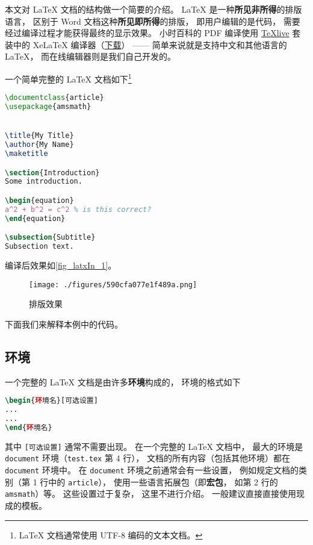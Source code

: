 
本文对 LaTeX 文档的结构做一个简要的介绍。 LaTeX 是一种\textbf{所见非所得}的排版语言， 区别于 Word 文档这种\textbf{所见即所得}的排版， 即用户编辑的是代码， 需要经过编译过程才能获得最终的显示效果。 小时百科的 PDF 编译使用 \href{https://www.tug.org/texlive/}{TeXlive} 套装中的 XeLaTeX 编译器（\href{https://www.tug.org/texlive/acquire-iso.html}{下载}）%
—— 简单来说就是支持中文和其他语言的 LaTeX， 而在线编辑器则是我们自己开发的。

一个简单完整的 LaTeX 文档如下\footnote{LaTeX 文档通常使用 UTF-8 编码的文本文档。}

\begin{lstlisting}[language=latex, caption=test.tex]
\documentclass{article}
\usepackage{amsmath}


\title{My Title}
\author{My Name}
\maketitle

\section{Introduction}
Some introduction.

\begin{equation}
a^2 + b^2 = c^2 % is this correct?
\end{equation}

\subsection{Subtitle}
Subsection text.


\end{lstlisting}

编译后效果如\autoref{fig_latxIn_1}。
\begin{figure}[ht]
\centering
\texttt{[image: ./figures/590cfa077e1f489a.png]}
\caption{排版效果} \label{fig_latxIn_1}
\end{figure}
下面我们来解释本例中的代码。

\subsection{环境}
一个完整的 LaTeX 文档是由许多\textbf{环境}构成的， 环境的格式如下
\begin{lstlisting}[language=latex]
\begin{环境名}[可选设置]
...
...
\end{环境名}
\end{lstlisting}
其中 \verb`[可选设置]` 通常不需要出现。 在一个完整的 LaTeX 文档中， 最大的环境是 \verb`document` 环境（\verb`test.tex` 第 4 行）， 文档的所有内容（包括其他环境）都在 \verb`document` 环境中。 在 \verb`document` 环境之前通常会有一些设置， 例如规定文档的类别（第 1 行中的 \verb`article`）， 使用一些语言拓展包（即\textbf{宏包}， 如第 2 行的 \verb`amsmath`）等。 这些设置过于复杂， 这里不进行介绍。 一般建议直接直接使用现成的模板。

